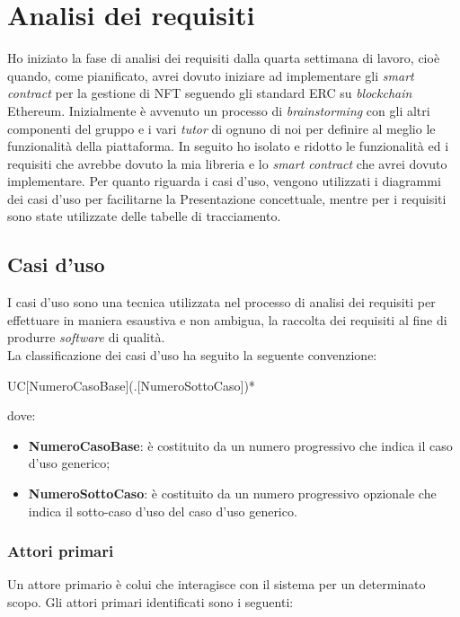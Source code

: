 
\section{Analisi dei requisiti}
Ho iniziato la fase di analisi dei requisiti dalla quarta settimana di lavoro, cioè quando, come pianificato, avrei dovuto iniziare ad implementare gli \textit{smart contract} per la gestione di NFT seguendo gli standard ERC su \textit{blockchain} Ethereum. Inizialmente è avvenuto un processo di \textit{brainstorming} con gli altri componenti del gruppo e i vari \textit{tutor} di ognuno di noi per definire al meglio le funzionalità della piattaforma. In seguito ho isolato e ridotto le funzionalità ed i requisiti che avrebbe dovuto la mia libreria e lo \textit{smart contract} che avrei dovuto implementare. Per quanto riguarda i casi d'uso, vengono utilizzati i diagrammi dei casi d'uso per facilitarne la Presentazione concettuale, mentre per i requisiti sono state utilizzate delle tabelle di tracciamento. 

\subsection{Casi d'uso}
I casi d'uso sono una tecnica utilizzata nel processo di analisi dei requisiti per effettuare in maniera esaustiva e non ambigua, la raccolta dei requisiti al fine di produrre \textit{software} di qualità. \\

\noindent La classificazione dei casi d'uso ha seguito la seguente convenzione:
\begin{center}
  UC[NumeroCasoBase](.[NumeroSottoCaso])*
\end{center}
dove:
\begin{itemize}
  \item \textbf{NumeroCasoBase}: è costituito da un numero progressivo che indica il caso d'uso generico;
  \item \textbf{NumeroSottoCaso}: è costituito da un numero progressivo opzionale che indica il sotto-caso d'uso del caso
  d'uso generico.
\end{itemize}

\subsubsection{Attori primari}
Un attore primario è colui che interagisce con il sistema per un determinato scopo.
Gli attori primari identificati sono i seguenti:

